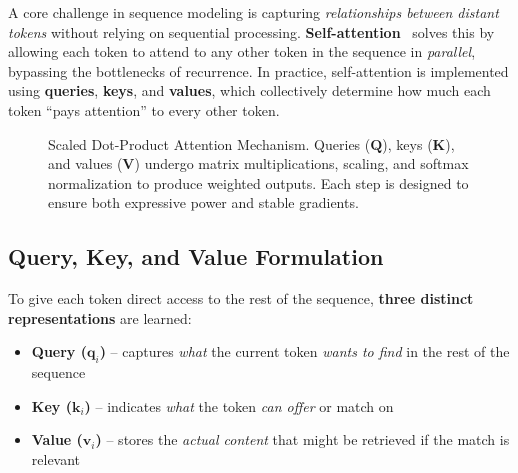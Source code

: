 \noindent
A core challenge in sequence modeling is capturing \emph{relationships between distant tokens} without relying on sequential processing. \textbf{Self-attention}~\cite{vaswani2017attention} solves this by allowing each token to attend to any other token in the sequence in \emph{parallel}, bypassing the bottlenecks of recurrence. In practice, self-attention is implemented using \textbf{queries}, \textbf{keys}, and \textbf{values}, which collectively determine how much each token “pays attention” to every other token.

\begin{figure}[h]
\centering
{}
\caption{Scaled Dot-Product Attention Mechanism. Queries ($\mathbf{Q}$), keys ($\mathbf{K}$), and values ($\mathbf{V}$) undergo matrix multiplications, scaling, and softmax normalization to produce weighted outputs. Each step is designed to ensure both expressive power and stable gradients.}
\label{fig:attention_mechanism}
\end{figure}

\subsection{Query, Key, and Value Formulation}
\noindent
To give each token direct access to the rest of the sequence, \textbf{three distinct representations} are learned:
\begin{itemize}
    \item \textbf{Query ($\mathbf{q}_i$)} – captures \emph{what} the current token \emph{wants to find} in the rest of the sequence
    \item \textbf{Key ($\mathbf{k}_i$)} – indicates \emph{what} the token \emph{can offer} or match on
    \item \textbf{Value ($\mathbf{v}_i$)} – stores the \emph{actual content} that might be retrieved if the match is relevant
\end{itemize}

